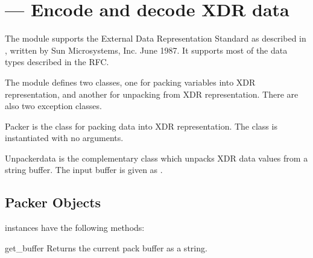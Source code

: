 \section{ ---
         Encode and decode XDR data}



The  module supports the External Data Representation
Standard as described in , written by Sun Microsystems,
Inc. June 1987.  It supports most of the data types described in the
RFC.

The  module defines two classes, one for packing
variables into XDR representation, and another for unpacking from XDR
representation.  There are also two exception classes.

\begin{classdesc}{Packer}{}
 is the class for packing data into XDR representation.
The  class is instantiated with no arguments.
\end{classdesc}

\begin{classdesc}{Unpacker}{data}
 is the complementary class which unpacks XDR data
values from a string buffer.  The input buffer is given as
.
\end{classdesc}


\begin{seealso}

\end{seealso}


\subsection{Packer Objects \label{xdr-packer-objects}}

 instances have the following methods:

\begin{methoddesc}[Packer]{get_buffer}{}
Returns the current pack buffer as a string.
\end{methoddesc}

